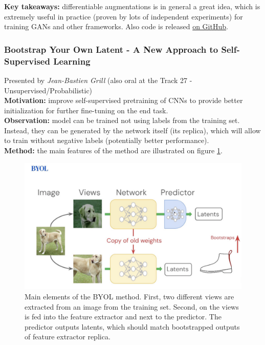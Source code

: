 {\bf Key takeaways:} differentiable augmentations is in general a great idea, which is extremely useful in practice (proven by lots of independent experiments) for training GANs and other frameworks. Also code is released \href{https://github.com/mit-han-lab/data-efficient-gans}{on GitHub}.

\subsubsection{Bootstrap Your Own Latent - A New Approach to Self-Supervised Learning \cite{GrillSATRBDPGAP20}}

Presented by \textit{Jean-Bastien Grill} (also oral at the Track 27 - Unsupervised/Probabilistic)  \\

{\bf Motivation:} improve self-supervised pretraining of CNNs to provide better initialization for further fine-tuning on the end task. \\

{\bf Observation:} model can be trained not using labels from the training set. Instead, they can be generated by the network itself (its replica), which will allow to train without negative labels (potentially better performance). \\

{\bf Method:} the main features of the method are illustrated on figure \ref{fig:self_supervision_framework}. \\

\begin{figure}[h!]
    \centering
    \includegraphics[scale=0.4]{neurips-2020/images/Screenshot 2020-12-11 at 19.06.09.png}
    \caption{Main elements of the BYOL method. First, two different views are extracted from an image from the training set. Second, on the views is fed into the feature extractor and next to the predictor. The predictor outputs latents, which should match bootstrapped outputs of feature extractor replica.}
    \label{fig:self_supervision_framework}
\end{figure} 

